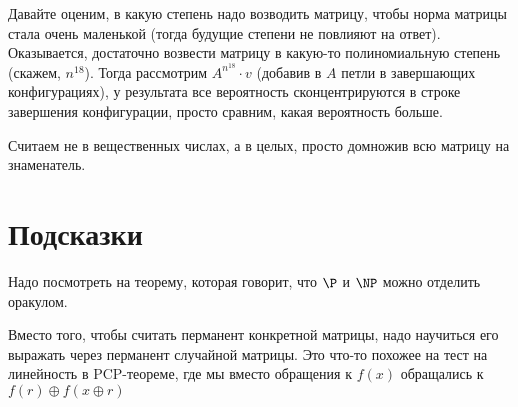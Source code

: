 	Давайте оценим, в какую степень надо возводить матрицу, чтобы норма матрицы стала очень маленькой
	(тогда будущие степени не повлияют на ответ).
	Оказывается, достаточно возвести матрицу в какую-то полиномиальную степень (скажем, $n^{18}$).
	Тогда рассмотрим $A^{n^{18}} \cdot v$ (добавив в $A$ петли в завершающих конфигурациях),
	у результата все вероятность сконцентрируются в строке завершения конфигурации, просто сравним, какая вероятность больше.

	Считаем не в вещественных числах, а в целых, просто домножив всю матрицу на знаменатель.

\section{Подсказки}
	Надо посмотреть на теорему, которая говорит, что $\P$ и $\NP$ можно отделить оракулом.

	Вместо того, чтобы считать перманент конкретной матрицы, надо научиться его выражать через перманент случайной матрицы.
	Это что-то похожее на тест на линейность в PCP-теореме, где мы вместо обращения к $f(x)$ обращались к $f(r) \oplus f(x \oplus r)$
